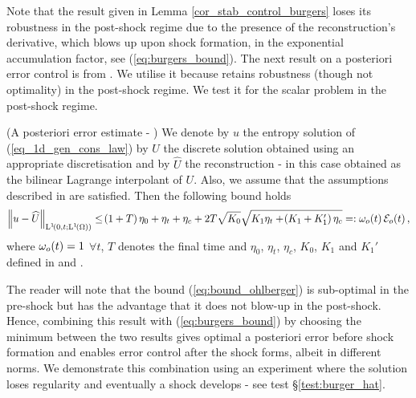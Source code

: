 \documentclass[final]{amsart}
\numberwithin{equation}{section}
\begin{document}
\begin{Rem} Note that the  result given in Lemma  \ref{cor_stab_control_burgers} loses its robustness in the post-shock regime due to the presence of the reconstruction's derivative, which blows up upon shock formation, in the exponential accumulation factor, see (\ref{eq:burgers_bound}).   The next result on a posteriori error control is from \cite{ohlberger2009review}.  We utilise it because retains robustness (though not optimality) in the post-shock regime.  We test it for the scalar problem in the post-shock regime.  
\end{Rem} 

\begin{The}(A posteriori error estimate - \cite[Thm. 5]{ohlberger2009review})\label{thm:aposteriori_ohlberger}
	We denote by $u$ the entropy solution of (\ref{eq_1d_gen_cons_law}) by $U$ the discrete solution obtained using an appropriate discretisation and by $\widehat{U}$ the reconstruction -  in this case obtained as the bilinear Lagrange interpolant of $U$.  Also, we assume that the assumptions described in \cite[\S3]{ohlberger2009review} are satisfied.  Then the following bound holds
	\begin{equation}\label{eq:bound_ohlberger}
	\begin{aligned}
	\left\|u-\widehat{U}\right\|_{\operatorname L^{1}\!\left({0,t;\operatorname L^{1}\!\left({\Omega}\right)}\right)}
	\leq
	\!\left({1+T}\right)\eta_0 
	+
	\eta_t
	+
	\eta_c
	+
	2T\sqrt{K_0}\sqrt{K_1\eta_t+\!\left({K_1+K_1'}\right)\eta_c}
	=:
	\omega_o\!\left({t}\right)\mathcal{E}_o\!\left({t}\right),
	\end{aligned}
	\end{equation}
	where $\omega_o\!\left({t}\right)=1$ $\forall t$,  $T$ denotes the final time and $\eta_0$, $\eta_t$, $\eta_c$, $K_0$, $K_1$ and $K_1'$ defined in \cite[Cor.1]{ohlberger2009review} and \cite[Thm. 5]{ohlberger2009review}.
\end{The}

\begin{Rem} The reader will note that the bound (\ref{eq:bound_ohlberger}) is sub-optimal in the pre-shock but has the advantage that it does not blow-up in the post-shock.  Hence, combining this result with (\ref{eq:burgers_bound}) by choosing the minimum between the two results gives optimal a posteriori error  before  shock formation and enables error control after the shock forms, albeit in different norms. We demonstrate this combination using an experiment where  the solution loses regularity and eventually a shock develops - see test \S \ref{test:burger_hat}.
\end{Rem}
\end{document}
